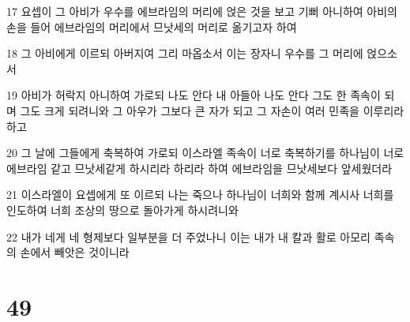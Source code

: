 \par 17 요셉이 그 아비가 우수를 에브라임의 머리에 얹은 것을 보고 기뻐 아니하여 아비의 손을 들어 에브라임의 머리에서 므낫세의 머리로 옮기고자 하여
\par 18 그 아비에게 이르되 아버지여 그리 마옵소서 이는 장자니 우수를 그 머리에 얹으소서
\par 19 아비가 허락지 아니하여 가로되 나도 안다 내 아들아 나도 안다 그도 한 족속이 되며 그도 크게 되려니와 그 아우가 그보다 큰 자가 되고 그 자손이 여러 민족을 이루리라 하고
\par 20 그 날에 그들에게 축복하여 가로되 이스라엘 족속이 너로 축복하기를 하나님이 너로 에브라임 같고 므낫세같게 하시리라 하리라 하여 에브라임을 므낫세보다 앞세웠더라
\par 21 이스라엘이 요셉에게 또 이르되 나는 죽으나 하나님이 너희와 함께 계시사 너희를 인도하여 너희 조상의 땅으로 돌아가게 하시려니와
\par 22 내가 네게 네 형제보다 일부분을 더 주었나니 이는 내가 내 칼과 활로 아모리 족속의 손에서 빼앗은 것이니라

\chapter{49}

